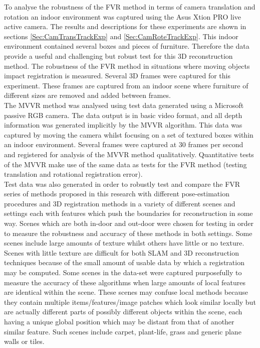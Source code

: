 To analyse the robustness of the FVR method in terms of camera translation and rotation an indoor environment was captured using the Asus Xtion PRO live active camera. The results and descriptions for these experiments are shown in sections \ref{Sec:CamTransTrackExp} and \ref{Sec:CamRoteTrackExp}. This indoor environment contained several boxes and pieces of furniture. Therefore the data provide a useful and challenging but robust test for this 3D reconstruction method. The robustness of the FVR method in situations where moving objects impact registration is measured. Several 3D frames were captured for this experiment. These frames are captured from an indoor scene where furniture of different sizes are removed and added between frames. \\



The MVVR method was analysed using test data generated using a Microsoft passive RGB camera. The data output is in basic video format, and all depth information was generated implicitly by the MVVR algorithm. This data was captured by moving the camera whilst focusing on a set of textured boxes within an indoor environment. Several frames were captured at 30 frames per second and registered for analysis of the MVVR method qualitatively. Quantitative tests of the MVVR make use of the same data as tests for the FVR method (testing translation and rotational registration error). \\

Test data was also generated in order to robustly test and compare the FVR series of methods proposed in this research with different pose-estimation procedures and 3D registration methods in a variety of different scenes and settings each with features which push the boundaries for reconstruction in some way. Scenes which are both in-door and out-door were chosen for testing in order to measure the robustness and accuracy of these methods in both settings. Some scenes include large amounts of texture whilst others have little or no texture. Scenes with little texture are difficult for both SLAM and 3D reconstruction techniques because of the small amount of usable data by which a registration may be computed. Some scenes in the data-set were captured purposefully to measure the accuracy of these algorithms when large amounts of local features are identical within the scene. These scenes may confuse local methods because they contain multiple items/features/image patches which look similar locally but are actually different parts of possibly different objects within the scene, each having a unique global position which may be distant from that of another similar feature. Such scenes include carpet, plant-life, grass and generic plane walls or tiles. \\

